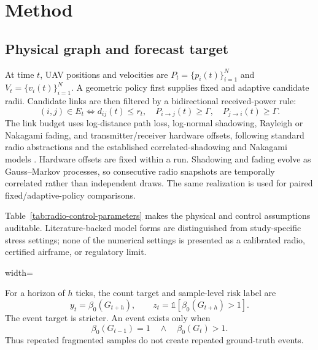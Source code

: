 \documentclass[final,5p,times,twocolumn]{elsarticle}
\begin{document}
\section{Method}
\label{sec:method}

\subsection{Physical graph and forecast target}

At time $t$, UAV positions and velocities are
$P_t=\{p_i(t)\}_{i=1}^{N}$ and $V_t=\{v_i(t)\}_{i=1}^{N}$.
A geometric policy first supplies fixed and adaptive candidate radii. Candidate links are
then filtered by a bidirectional received-power rule:
\begin{equation}
(i,j)\in E_t \Longleftrightarrow d_{ij}(t)\le r_t,\quad
P_{i\rightarrow j}(t)\ge\Gamma,\quad P_{j\rightarrow i}(t)\ge\Gamma .
\end{equation}
The link budget uses log-distance path loss, log-normal shadowing, Rayleigh or Nakagami
fading, and transmitter/receiver hardware offsets, following standard radio abstractions
and the established correlated-shadowing and Nakagami models
\cite{goldsmith2005wireless,gudmundson1991correlation,nakagami1960mdistribution}. Hardware offsets are fixed within a
run. Shadowing and fading evolve as Gauss--Markov processes, so consecutive radio
snapshots are temporally correlated rather than independent draws. The same realization is
used for paired fixed/adaptive-policy comparisons.

Table~\ref{tab:radio-control-parameters} makes the physical and control assumptions
auditable. Literature-backed model forms are distinguished from study-specific stress
settings; none of the numerical settings is presented as a calibrated radio, certified
airframe, or regulatory limit.

\begin{table}[t]
\centering
\caption{Radio, forecast, and controller parameters. ``Stress setting'' denotes a fixed
simulation choice rather than an empirical hardware claim.}
\label{tab:radio-control-parameters}
\small
\begin{adjustbox}{width=\textwidth}

\end{adjustbox}
\end{table}

For a horizon of $h$ ticks, the count target and sample-level risk label are
\begin{equation}
y_t=\beta_0(G_{t+h}),\qquad z_t=\mathbb{1}[\beta_0(G_{t+h})>1].
\end{equation}
The event target is stricter. An event exists only when
\begin{equation}
\beta_0(G_{t-1})=1\quad\land\quad\beta_0(G_t)>1.
\end{equation}
Thus repeated fragmented samples do not create repeated ground-truth events.
\end{document}
